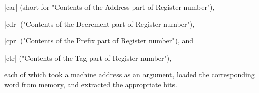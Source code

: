 \begin{description}
\item{|car|} (short for "Contents of the Address part of Register number"),
\item{|cdr|} ("Contents of the Decrement part of Register number"),
\item{|cpr|} ("Contents of the Prefix part of Register number"), and
\item{|ctr|} ("Contents of the Tag part of Register number"),
\end{description}
each of which took a machine address as an argument, loaded the corresponding word from memory, and extracted the appropriate bits.














